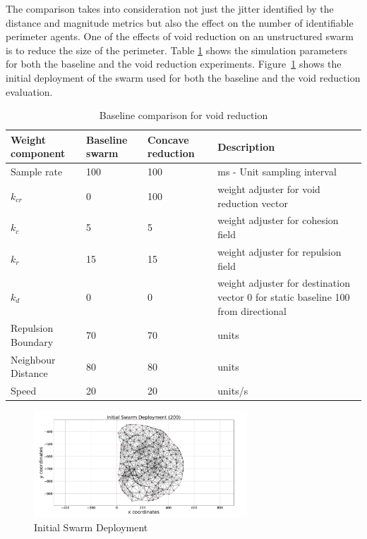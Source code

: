 \documentclass[preprint,12pt]{elsarticle}
\begin{document}
The comparison takes into consideration not just the jitter identified by the distance and magnitude metrics but also the effect on the number of identifiable perimeter agents. One of the effects of void reduction on an unstructured swarm is to reduce the size of the perimeter. Table \ref{tab:BaselineConcaveReduction} shows the simulation parameters for both the baseline and the void reduction experiments. Figure~\ref{fig:ConcaveInitial} shows the initial deployment of the swarm used for both the baseline and the void reduction evaluation.

\begin{table}
\caption{Baseline comparison for void reduction}\label{tab:BaselineConcaveReduction}
\begin{center}
\begin{tabular}{| p{1.4cm} | p{1.2cm} | p{1.2cm} | p{2.5cm} |}
\hline
\bf Weight \bf component & \bf Baseline \bf swarm & \bf Concave \bf reduction & \bf Description \\ \hline
Sample rate & 100 & 100 & ms - Unit sampling interval\\  \hline
$k_{cr}$ & 0 & 100 & weight adjuster for void reduction vector\\  \hline
$k_c$ & 5 & 5 & weight adjuster for cohesion field\\  \hline
$k_r$ & 15 & 15 & weight adjuster for repulsion field\\  \hline
$k_d$ & 0 & 0 & weight adjuster for destination vector 0 for static baseline 100 from directional\\  \hline
Repulsion Boundary & 70 & 70 & units\\  \hline
Neighbour Distance & 80 & 80 & units\\  \hline
Speed & 20 & 20 & units/s\\  \hline
\end{tabular}
\end{center}
\end{table}

\begin{figure}
\begin{center}
\includegraphics[width=8cm]{figures/ConcaveInitial}
\end{center}
\caption{Initial Swarm Deployment\label{fig:ConcaveInitial}}
\end{figure}
\end{document}
